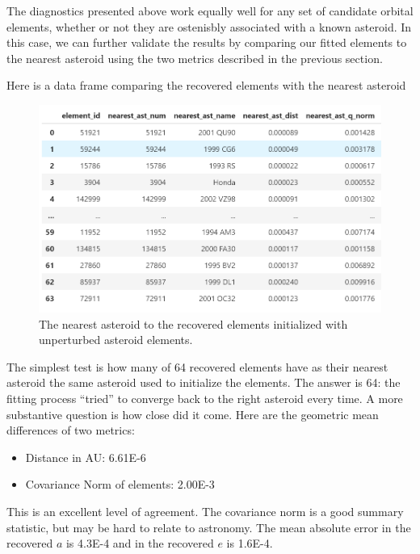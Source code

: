 The diagnostics presented above work equally well for any set of candidate orbital elements,
whether or not they are ostenisbly associated with a known asteroid.
In this case, we can further validate the results by comparing our fitted elements to the nearest asteroid
using the two metrics described in the previous section.

Here is a data frame comparing the recovered elements with the nearest asteroid 
\begin{figure}[h]
\begin{center}
\includegraphics[width=1.0\textwidth]{../figs/search_known/unperturbed/nearest_ast_dataframe.png}
\caption{The nearest asteroid to the recovered elements initialized with unperturbed asteroid elements.}
\end{center}
\end{figure}
The simplest test is how many of 64 recovered elements have as their nearest asteroid the same asteroid used to initialize the elements.
The answer is 64: the fitting process ``tried'' to converge back to the right asteroid every time.
A more substantive question is how close did it come.  
Here are the geometric mean differences of two metrics:
\begin{itemize}
\item Distance in AU: 6.61E-6
\item Covariance Norm of elements: 2.00E-3
\end{itemize}
This is an excellent level of agreement.
The covariance norm is a good summary statistic, but may be hard to relate to astronomy.
The mean absolute error in the recovered $a$ is 4.3E-4 and in the recovered $e$ is 1.6E-4.


